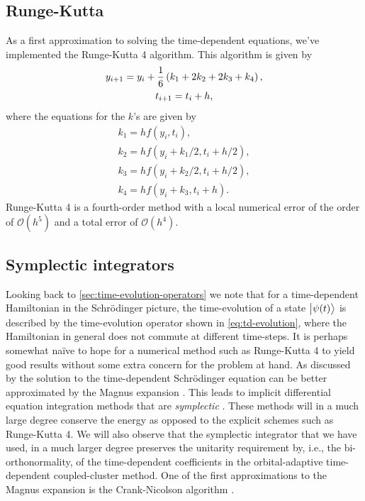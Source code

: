         \subsection{Runge-Kutta}
            As a first approximation to solving the time-dependent equations,
            we've implemented the Runge-Kutta 4 algorithm.
            This algorithm is given by \cite{wiki:rk4}
            \begin{gather}
                y_{i + 1} = y_i + \frac{1}{6}\left( 
                    k_1 + 2 k_2 + 2 k_3 + k_4
                 \right), \\
                t_{i + 1} = t_i + h,
            \end{gather}
            where the equations for the $k$'s are given by
            \begin{gather}
                k_1 = h f(y_i, t_i), \\
                k_2 = h f(y_i + k_1 / 2, t_i + h / 2), \\
                k_3 = h f(y_i + k_2 / 2, t_i + h / 2), \\
                k_4 = h f(y_i + k_3, t_i + h).
            \end{gather}
            Runge-Kutta 4 is a fourth-order method with a local numerical error
            of the order of $\mathcal{O}(h^5)$ and a total error of
            $\mathcal{O}(h^4)$.

        \subsection{Symplectic integrators}
            Looking back to \autoref{sec:time-evolution-operators} we note that
            for a time-dependent Hamiltonian in the Schrödinger picture, the
            time-evolution of a state $\ket{\psi(t)}$ is described by the
            time-evolution operator shown in \autoref{eq:td-evolution}, where
            the Hamiltonian in general does not commute at different time-steps.
            It is perhaps somewhat naïve to hope for a numerical method such as
            Runge-Kutta 4 to yield good results without some extra concern for
            the problem at hand.
            As discussed by \citeauthor{joshua-magnus} \cite{joshua-magnus} the
            solution to the time-dependent Schrödinger equation can be better
            approximated by the Magnus expansion \cite{magnus-expansion}.
            This leads to implicit differential equation integration methods
            that are \emph{symplectic} \cite{joshua-magnus}.
            These methods will in a much large degree conserve the energy as
            opposed to the explicit schemes such as Runge-Kutta 4.
            We will also observe that the symplectic integrator that we have
            used, in a much larger degree preserves the unitarity requirement
            by, i.e., the bi-orthonormality, of the time-dependent coefficients
            in the orbital-adaptive time-dependent coupled-cluster method.
            One of the first approximations to the Magnus expansion is the
            Crank-Nicolson algorithm \cite{ullrich2011time}.

